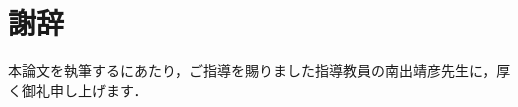 \documentclass[uplatex,a4j]{jsreport}
\begin{document}
\section*{謝辞}
本論文を執筆するにあたり，ご指導を賜りました指導教員の南出靖彦先生に，厚く御礼申し上げます．
\end{document}
